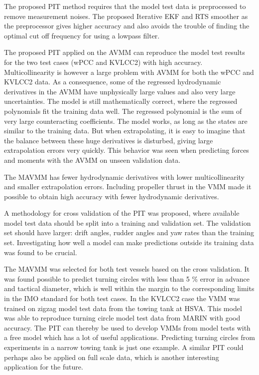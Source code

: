 \documentclass[review]{elsarticle}
\begin{document}
\sphinxAtStartPar
The proposed PIT method requires that the model test data is preprocessed to remove measurement noises. The proposed Iterative EKF and RTS smoother as the preprocessor gives higher accuracy and also avoids the trouble of finding the optimal cut off frequency for using a low\sphinxhyphen{}pass filter.

\sphinxAtStartPar
The proposed PIT applied on the AVMM can reproduce the model test results for the two test cases (wPCC and KVLCC2) with high accuracy. Multicollinearity is however a large problem with AVMM for both the wPCC and KVLCC2 data. As a consequence, some of the regressed hydrodynamic derivatives in the AVMM have unphysically large values and also very large uncertainties. The model is still mathematically correct, where the regressed polynomials fit the training data well.
The regressed polynomial is the sum of very large counteracting coefficients. The model works, as long as the states are similar to the training data. But when extrapolating, it is easy to imagine that the balance between these huge derivatives is disturbed, giving large extrapolation errors very quickly. This behavior was seen when predicting forces and moments with the AVMM on unseen validation data.

\sphinxAtStartPar
The MAVMM has fewer hydrodynamic derivatives with lower multicollinearity and smaller extrapolation errors. Including propeller thrust in the VMM made it possible to obtain high accuracy with fewer hydrodynamic derivatives.

\sphinxAtStartPar
A methodology for cross validation of the PIT was proposed, where available model test data should be split into a training and validation set. The validation set should have larger: drift angles, rudder angles and yaw rates than the training set. Investigating how well a model can make predictions outside its training data was found to be crucial.

\sphinxAtStartPar
The MAVMM was selected for both test vessels based on the cross validation. It was found possible to predict turning circles with less than 5 \% error in advance and tactical diameter, which is well within the margin to the corresponding limits in the IMO standard for both test cases. In the KVLCC2 case the VMM was trained on zigzag model test data from the towing tank at HSVA. This model was able to reproduce turning circle model test data from MARIN with good accuracy. The PIT can thereby be used to develop VMMs from model tests with a free model which has a lot of useful applications. Predicting turning circles from experiments in a narrow towing tank is just one example. A similar PIT could perhaps also be applied on full scale data, which is another interesting application for the future.
\end{document}

